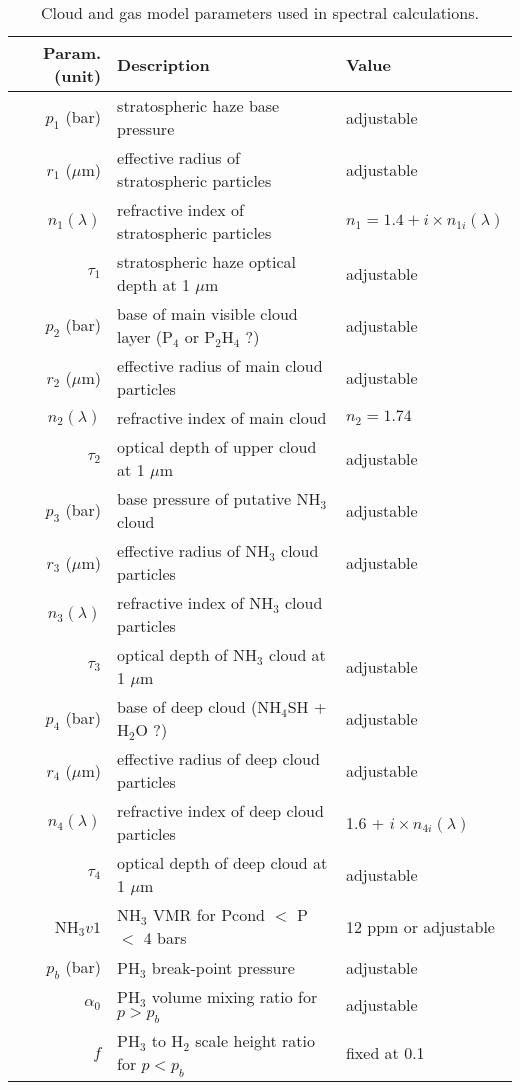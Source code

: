 \documentclass[article,11pt]{emulateapj}
\def\hto{H$_2$O }
\def\mum{$\mu$m }
\def\mumx{$\mu$m}
\def\hto{H$_2$O }
\def\pht{PH$_3$ }
\def\pthf{P$_2$H$_4$ }
\def\nht{NH$_3$ }
\def\nhfsh{NH$_4$SH }
\begin{document}
\begin{table*}[!htb]\centering
\caption{Cloud and gas model parameters used in spectral
  calculations.}
\begin{tabular}{r l l }
Param. (unit) & Description & Value\\
\hline
$p_1$ (bar) & stratospheric haze base pressure & adjustable\\
$r_1$ (\mumx) & effective radius of stratospheric particles & adjustable\\
$n_1(\lambda)$ & refractive index of stratospheric particles & $n_1=1.4 +i\times n_{1i}(\lambda)$\\
$\tau_1$ & stratospheric haze optical depth at 1 \mum & adjustable\\
\hline
$p_{2}$ (bar) & base of main visible cloud layer (P$_4$ or \pthf ?)  & adjustable\\
$r_2$ (\mumx) & effective radius of main cloud particles & adjustable\\
$n_2(\lambda)$ & refractive index of main cloud & $n_2=1.74$\\
$\tau_2$ & optical depth of upper cloud at 1 \mum & adjustable\\
\hline
$p_3$ (bar) & base pressure of putative \nht cloud & adjustable\\
$r_3$ (\mumx) & effective radius of \nht cloud particles & adjustable\\
$n_3(\lambda)$ & refractive index of \nht cloud particles & \cite{Martonchik1984} \\
$\tau_3$ & optical depth of \nht cloud at 1 \mum & adjustable\\
\hline
$p_{4}$ (bar) & base of deep cloud (\nhfsh + \hto?) & adjustable\\
$r_4$ (\mumx) & effective radius of deep cloud particles & adjustable\\
$n_4(\lambda)$ & refractive index of deep cloud particles &1.6 + $i\times n_{4i}(\lambda)$  \\
$\tau_4$  & optical depth of deep cloud at 1 \mum & adjustable\\
\hline
NH$_3v1$ & \nht VMR for Pcond $<$ P $<$ 4 bars & 12 ppm or adjustable \\
$p_b$ (bar) & \pht break-point pressure & adjustable\\ 
$\alpha_0$ & \pht volume mixing ratio for $p > p_b$ & adjustable\\
$f$  & \pht to H$_2$ scale height ratio for $p < p_b$  & fixed at 0.1\\ 

\end{tabular}
\end{table*}
\end{document}
